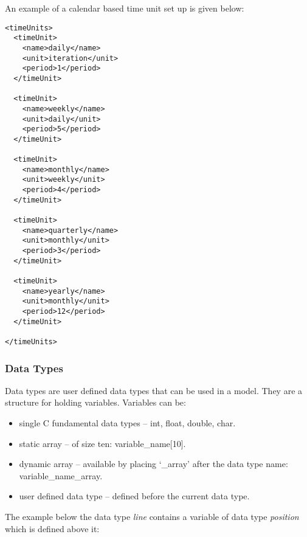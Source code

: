 An example of a calendar based time unit set up is given below:

\begin{mylisting}
\begin{verbatim}
<timeUnits>
  <timeUnit>
    <name>daily</name>
    <unit>iteration</unit>
    <period>1</period>
  </timeUnit>

  <timeUnit>
    <name>weekly</name>
    <unit>daily</unit>
    <period>5</period>
  </timeUnit>

  <timeUnit>
    <name>monthly</name>
    <unit>weekly</unit>
    <period>4</period>
  </timeUnit>

  <timeUnit>
    <name>quarterly</name>
    <unit>monthly</unit>
    <period>3</period>
  </timeUnit>

  <timeUnit>
    <name>yearly</name>
    <unit>monthly</unit>
    <period>12</period>
  </timeUnit>

</timeUnits>
\end{verbatim}
\end{mylisting}

\subsubsection{Data Types}

Data types are user defined data types that can be used in a model. They are a
structure for holding variables. Variables can be:

\begin{itemize}
  \item single C fundamental data types -- int, float, double, char.
  \item static array -- of size ten: variable\_name[10].
  \item dynamic array -- available by placing `\_array' after
  the data type name: variable\_name\_array.
  \item user defined data type -- defined before the current data type.
\end{itemize}

The example below the data type \emph{line} contains a variable
of data type \emph{position} which is defined above it:

